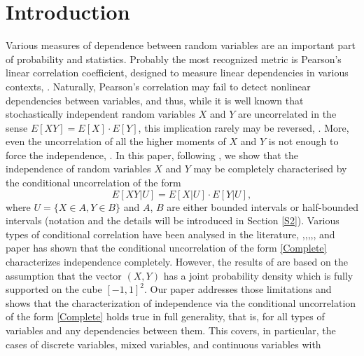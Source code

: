 \documentclass[sn-mathphys,Numbered,11pt]{sn-jnl}%
\theoremstyle{thmstyleone}%
\begin{document}



\maketitle

\section{Introduction}\label{sec1}

Various measures  of dependence between random variables are an important part of probability and statistics. Probably the most recognized  metric is Pearson's linear correlation coefficient, designed to measure linear dependencies in various contexts, \cite{LN}. Naturally, Pearson's correlation may fail to detect nonlinear dependencies between variables, and thus,  while it is well known that stochastically independent random variables  $X$ and $Y$ are  uncorrelated in the sense $E[XY]=E[X]\cdot E[Y]$,  this implication rarely may be reversed, \cite{David}. More, even the uncorrelation of all the higher moments of $X$ and $Y$ is not enough to force the independence, \cite{DePaula}. In this paper, following \cite{JJP}, we show that the independence of random variables $X$ and $Y$ may be completely characterised by the conditional uncorrelation of the form 
\begin{equation}\label{Complete}
E[XY|U]=E[X|U]\cdot E[Y|U],
\end{equation} where $U=\{X\in A, Y\in B\}$ and $A$, $B$ are either bounded intervals or half-bounded intervals (notation and the details will be introduced in Section \ref{S2}).  
Various types of conditional correlation have been analysed in the literature,  \cite{Akeman},\cite{Baba},\cite{JJP},\cite{Lawrance},\cite{LT}, and paper \cite{JJP} has shown that the conditional 
uncorrelation of the form \eqref{Complete} characterizes independence completely. However, the results of \cite{JJP} are based on the assumption that the vector $(X,Y)$ has a joint probability density 
which is fully supported on the cube $[-1,1]^2$. Our paper addresses those limitations and shows that the characterization of independence via the conditional uncorrelation of the form \eqref{Complete} 
holds true in full generality, that is,  for all types of variables and any dependencies between them. This covers, in particular, the cases of discrete variables, mixed variables, and continuous variables with 
\end{document}
